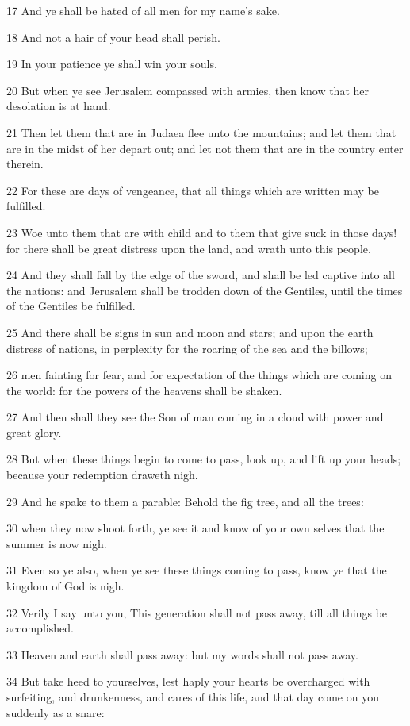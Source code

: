 \par 17 And ye shall be hated of all men for my name's sake.
\par 18 And not a hair of your head shall perish.
\par 19 In your patience ye shall win your souls.
\par 20 But when ye see Jerusalem compassed with armies, then know that her desolation is at hand.
\par 21 Then let them that are in Judaea flee unto the mountains; and let them that are in the midst of her depart out; and let not them that are in the country enter therein.
\par 22 For these are days of vengeance, that all things which are written may be fulfilled.
\par 23 Woe unto them that are with child and to them that give suck in those days! for there shall be great distress upon the land, and wrath unto this people.
\par 24 And they shall fall by the edge of the sword, and shall be led captive into all the nations: and Jerusalem shall be trodden down of the Gentiles, until the times of the Gentiles be fulfilled.
\par 25 And there shall be signs in sun and moon and stars; and upon the earth distress of nations, in perplexity for the roaring of the sea and the billows;
\par 26 men fainting for fear, and for expectation of the things which are coming on the world: for the powers of the heavens shall be shaken.
\par 27 And then shall they see the Son of man coming in a cloud with power and great glory.
\par 28 But when these things begin to come to pass, look up, and lift up your heads; because your redemption draweth nigh.
\par 29 And he spake to them a parable: Behold the fig tree, and all the trees:
\par 30 when they now shoot forth, ye see it and know of your own selves that the summer is now nigh.
\par 31 Even so ye also, when ye see these things coming to pass, know ye that the kingdom of God is nigh.
\par 32 Verily I say unto you, This generation shall not pass away, till all things be accomplished.
\par 33 Heaven and earth shall pass away: but my words shall not pass away.
\par 34 But take heed to yourselves, lest haply your hearts be overcharged with surfeiting, and drunkenness, and cares of this life, and that day come on you suddenly as a snare:
